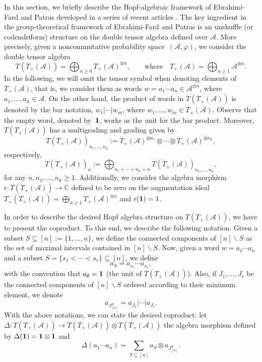 \documentclass[11pt]{article}
\numberwithin{equation}{section}
\numberwithin{equation}{section}
\newcommand{\A}{\mathcal{A}}
\newcommand{\uno}{{\bf{1}}}
\begin{document}
In this section, we briefly describe the Hopf-algebraic framework of Ebrahimi-Fard and Patras developed in a series of recent articles \cite{EFP1, EFP2, EFP3, EFP4, EFP5}. The key ingredient in the group-theoretical framework of Ebrahimi-Fard and Patras is an unshuffle (or codendriform) structure on the double tensor algebra defined over $\A$. More precisely, given a noncommutative probability space~$(\A,\varphi)$, we consider the double tensor algebra
\[
	T(T_+(\A)) = \bigoplus_{n\geq0} T_+(\A)^{\otimes n},
	\qquad\text{where}\quad
	T_+(\A) = \bigoplus_{n\geq1} \A^{\otimes n}.
\]
In the following, we will omit the tensor symbol when denoting elements of $T_+(\A)$, that is, we consider them as words $w = a_1\cdots a_n \in \A^{\otimes n}$, where $a_1,\dots,a_n\in \A$. On the other hand, the product of words in $T(T_+(\A))$ is denoted by the bar notation, $w_1|\cdots |w_m$, where $w_1,\dots,w_m \allowbreak\in T_+(\A)$. Observe that the empty word, denoted by~$\uno$, works as the unit for the bar product. Moreover, $T(T_+(\A))$ has a multigrading and grading given by
\[
	T(T_+(\A))_{n_1,\dots,n_k}
	:= T_+(\A)^{\otimes n_1} \otimes \cdots \otimes T_+(\A)^{\otimes n_k},
\]
respectively,
\[
	T(T_+(\A))_n :=
	\bigoplus_{n_1+\cdots + n_k = n} T(T_+(\A))_{n_1,\dots,n_k},
\]
for any $n,n_1,\dots,n_k\geq1$. Additionally, we consider the algebra morphism $\epsilon\colon T(T_+(\A))\to\mathbb{C}$ defined to be zero on the augmentation ideal $T_+(T_+(\A)) = \bigoplus_{n\geq 1} T_+(\A)^{\otimes n}$ and $\epsilon(\uno) = 1$.

In order to describe the desired Hopf algebra structure on $T(T_+(\A))$, we have to present the coproduct. To this end,
 we describe the following notation. Given a subset $S\subseteq [n] :=\{1,\dots, n\}$, we define the connected components of $[n]\backslash S$ as the set of maximal intervals contained in $[n]\backslash S$. Now, given a word $w= a_1\cdots a_n$ and a subset $S = \{s_1 <\cdots < s_r\} \subseteq [n]$, we define
\[
	a_S = a_{s_1}\cdots a_{s_r},
\]
with the convention that $a_\emptyset = \uno$ (the unit of $T(T_+(\A))$). Also, if $J_1,\dots,J_r$ be the connected components of $[n] \backslash S$ ordered according to their minimum element, we denote
\[
	a_{J_{[n]}^S} = a_{J_1} | \cdots | a_{J_r}.
\]
With the above notations, we can state the desired coproduct: let $\Delta\colon T(T_+(\A))\to T(T_+(\A))\otimes T(T_+(\A))$ the algebra morphism defined by $\Delta(\uno) = \uno\otimes \uno$ and
\begin{equation}
\label{eq:copEFP}
	\Delta(a_1\cdots a_n)= \sum_{S\subseteq [n]} a_S \otimes a_{J_{[n]}^S}.
\end{equation}
\end{document}
